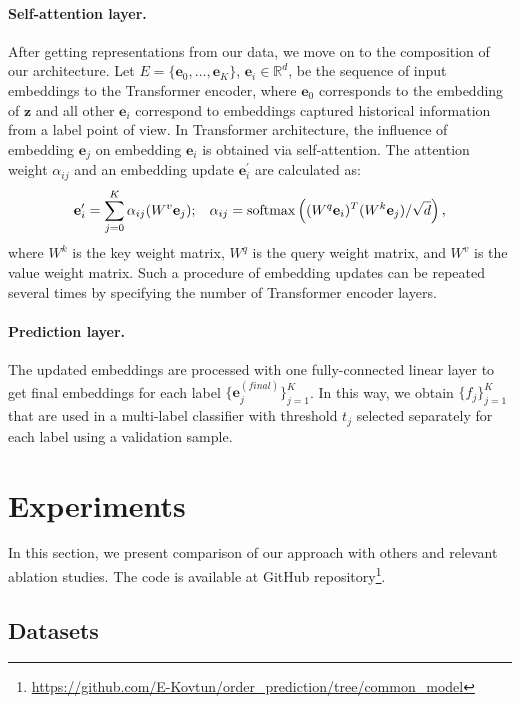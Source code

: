 \documentclass[runningheads]{llncs}
\newcommand{\vecE}{\mathbf{e}}
\begin{document}
\paragraph{\textbf{Self-attention layer.}} After getting representations from our data, we move on to the composition of our architecture. 
Let $E = \{\vecE_0, \dots, \vecE_{K}\}$, $\vecE_i \in \mathbb{R}^d$, be the sequence of input embeddings to the Transformer encoder, where $\vecE_0$ corresponds to the embedding of $\mathbf{z}$ and all other $\vecE_i$ correspond to embeddings captured historical information from a label point of view. 
In Transformer architecture, the influence of embedding $\vecE_j$ on embedding $\vecE_i$ is obtained via self-attention. The attention weight $\alpha_{ij}$ and an embedding update $\vecE_i^{\prime}$ are calculated as:
$$ \vecE_i^{\prime} = \sum_{j = 0}^{K} \alpha_{ij} (W^v \vecE_j);\hspace{3mm} \alpha_{ij} = \mathrm{softmax}\left ( (W^q \vecE_i)^T (W^k \vecE_j) / \sqrt{d} \right),$$
    where $W^k$ is the key weight matrix, $W^q$ is the query weight matrix, and $W^v$ is the value weight matrix. Such a procedure of embedding updates can be repeated several times by specifying the number of Transformer encoder layers.


\paragraph{\textbf{Prediction layer.}} The updated embeddings are processed with one fully-connected linear layer to get final embeddings for each label $\{\vecE^{(final)}_j\}_{j = 1}^K$.
In this way, we obtain $\{f_j\}_{j = 1}^K$ that are used in a multi-label classifier with threshold $t_j$ selected separately for each label using a validation sample.

\section{Experiments} 
\label{sec:experiments}

In this section, we present comparison of our approach with others and relevant ablation studies.
The code is available at GitHub repository\footnote{\url{https://github.com/E-Kovtun/order_prediction/tree/common_model}}.

\subsection{Datasets}
\end{document}
